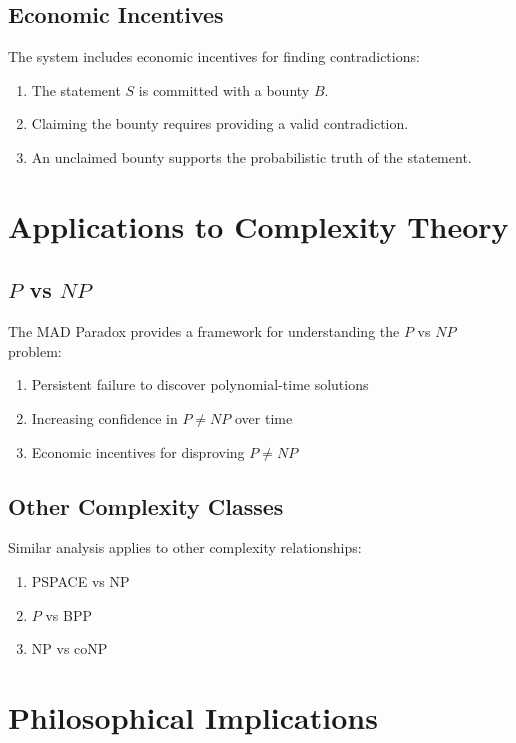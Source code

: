 \documentclass[11pt]{article}
\begin{document}
\subsection{Economic Incentives}

The system includes economic incentives for finding contradictions:
\begin{enumerate}[label=(\arabic*)]
    \item The statement $S$ is committed with a bounty $B$.
    \item Claiming the bounty requires providing a valid contradiction.
    \item An unclaimed bounty supports the probabilistic truth of the statement.
\end{enumerate}

\section{Applications to Complexity Theory}

\subsection{$P$ vs $NP$}

The MAD Paradox provides a framework for understanding the $P$ vs $NP$ problem:
\begin{enumerate}[label=(\arabic*)]
    \item Persistent failure to discover polynomial-time solutions
    \item Increasing confidence in $P \neq NP$ over time  
    \item Economic incentives for disproving $P \neq NP$
\end{enumerate}

\subsection{Other Complexity Classes}

Similar analysis applies to other complexity relationships:
\begin{enumerate}[label=(\arabic*)]
    \item PSPACE vs NP
    \item $P$ vs BPP
    \item NP vs coNP
\end{enumerate}

\section{Philosophical Implications}
\end{document}
